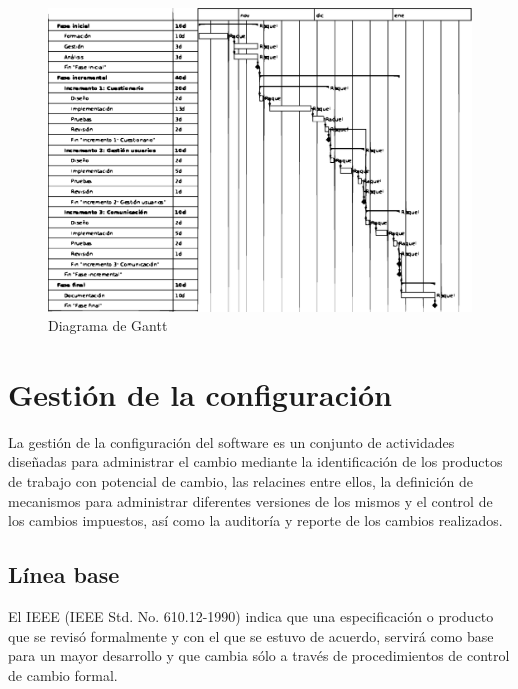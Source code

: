 \begin{figure}[htbp] 
    \centering
    \includegraphics[width=1\textwidth]{figuras/gantt.eps}
    \caption{Diagrama de Gantt}
    \label{fig:gantt}
\end{figure}	


\section{Gestión de la configuración}
La gestión de la configuración del software es un conjunto de actividades diseñadas para administrar el cambio mediante la identificación de los productos de trabajo con potencial de cambio, las relacines entre ellos, la definición de mecanismos para administrar diferentes versiones de los mismos y el control de los cambios impuestos, así como la auditoría y reporte de los cambios realizados\cite{pressman}.

\subsection{Línea base}
El IEEE (IEEE Std. No. 610.12-1990) indica que una especificación o producto que se revisó formalmente y con el que se estuvo de acuerdo, servirá como base para un mayor desarrollo y que cambia sólo a través de procedimientos de control de cambio formal.


